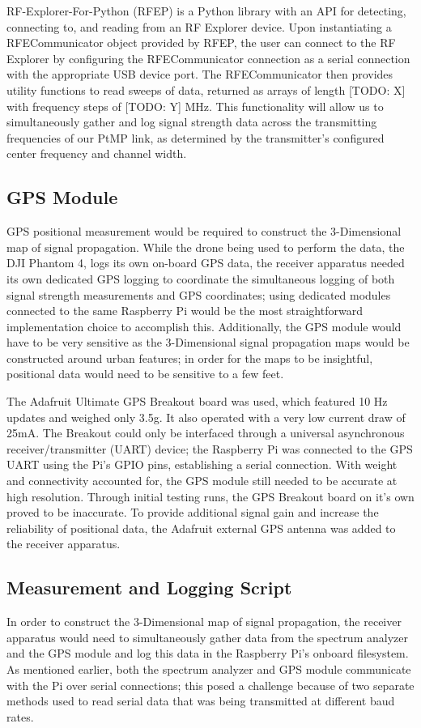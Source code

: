 \documentclass[pageno]{jpaper}
\begin{document}
RF-Explorer-For-Python (RFEP) is a Python library with an API for detecting, connecting to, and reading from an RF Explorer device. Upon instantiating a RFECommunicator object provided by RFEP, the user can connect to the RF Explorer by configuring the RFECommunicator connection as a serial connection with the appropriate USB device port. The RFECommunicator then provides utility functions to read sweeps of data, returned as arrays of length [TODO: X] with frequency steps of [TODO: Y] MHz. This functionality will allow us to simultaneously gather and log signal strength data across the transmitting frequencies of our PtMP link, as determined by the transmitter's configured center frequency and channel width.

\subsection{GPS Module}
GPS positional measurement would be required to construct the 3-Dimensional map of signal propagation. While the drone being used to perform the data, the DJI Phantom 4, logs its own on-board GPS data, the receiver apparatus needed its own dedicated GPS logging to coordinate the simultaneous logging of both signal strength measurements and GPS coordinates; using dedicated modules connected to the same Raspberry Pi would be the most straightforward implementation choice to accomplish this. Additionally, the GPS module would have to be very sensitive as the 3-Dimensional signal propagation maps would be constructed around urban features; in order for the maps to be insightful, positional data would need to be sensitive to a few feet.

The Adafruit Ultimate GPS Breakout board was used, which featured 10 Hz updates and weighed only 3.5g. It also operated with a very low current draw of 25mA. The Breakout could only be interfaced through a universal asynchronous receiver/transmitter (UART) device; the Raspberry Pi was connected to the GPS UART using the Pi's GPIO pins, establishing a serial connection. With weight and connectivity accounted for, the GPS module still needed to be accurate at high resolution. Through initial testing runs, the GPS Breakout board on it's own proved to be inaccurate. To provide additional signal gain and increase the reliability of positional data, the Adafruit external GPS antenna was added to the receiver apparatus.  

\subsection{Measurement and Logging Script}
In order to construct the 3-Dimensional map of signal propagation, the receiver apparatus would need to simultaneously gather data from the spectrum analyzer and the GPS module and log this data in the Raspberry Pi's onboard filesystem. As mentioned earlier, both the spectrum analyzer and GPS module communicate with the Pi over serial connections; this posed a challenge because of two separate methods used to read serial data that was being transmitted at different baud rates.
\end{document}
